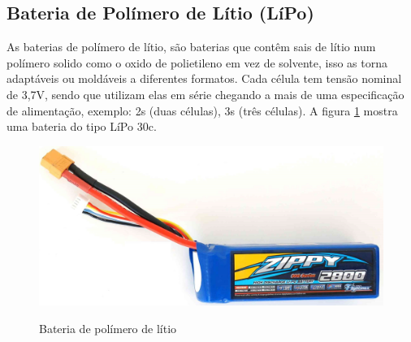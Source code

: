 \subsection{Bateria de Polímero de Lítio (LíPo)}
As baterias de polímero de lítio, são baterias que contêm sais de lítio num polímero solido como o oxido de polietileno em vez de solvente, isso as torna adaptáveis ou moldáveis a diferentes formatos. Cada célula tem tensão nominal de 3,7V, sendo que utilizam elas em série chegando a mais de uma especificação de alimentação, exemplo: 2s (duas células), 3s (três células). A figura \ref{fig:bat} mostra uma bateria do tipo LíPo 30c.
\begin{figure}[H]
  \centering
  \caption{Bateria de polímero de lítio}
  \includegraphics[scale=.2]{figs/bateria.jpg}
  \label{fig:bat}
\end{figure}
